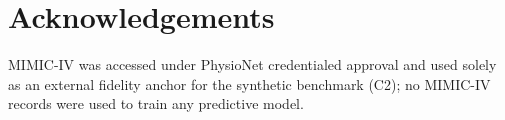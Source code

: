 \documentclass[journal]{IEEEtran}
\begin{document}
\section*{Acknowledgements}
MIMIC-IV was accessed under PhysioNet credentialed approval and
used solely as an external fidelity anchor for the synthetic benchmark (C2);
no MIMIC-IV records were used to train any predictive model.



\end{document}
